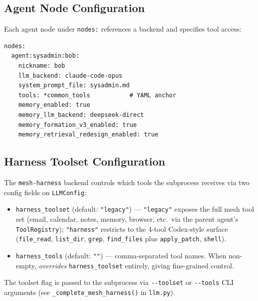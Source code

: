 \documentclass[11pt,a4paper]{article}
\newcommand{\code}[1]{\texttt{#1}}
\begin{document}
\subsection{Agent Node Configuration}

Each agent node under \code{nodes:} references a backend and specifies
tool access:
\begin{lstlisting}
nodes:
  agent:sysadmin:bob:
    nickname: bob
    llm_backend: claude-code-opus
    system_prompt_file: sysadmin.md
    tools: *common_tools           # YAML anchor
    memory_enabled: true
    memory_llm_backend: deepseek-direct
    memory_formation_v3_enabled: true
    memory_retrieval_redesign_enabled: true
\end{lstlisting}

\subsection{Harness Toolset Configuration}
\label{sec:harness-toolset}

The \code{mesh-harness} backend controls which tools the subprocess
receives via two config fields on \code{LLMConfig}:

\begin{itemize}[nosep]
  \item \code{harness\_toolset} (default: \code{"legacy"}) ---
        \code{"legacy"} exposes the full mesh tool set (email, calendar,
        notes, memory, browser, etc.\ via the parent agent's
        \code{ToolRegistry}); \code{"harness"} restricts to the 4-tool
        Codex-style surface (\code{file\_read}, \code{list\_dir},
        \code{grep}, \code{find\_files} plus \code{apply\_patch},
        \code{shell}).
  \item \code{harness\_tools} (default: \code{""}) --- comma-separated
        tool names. When non-empty, \emph{overrides}
        \code{harness\_toolset} entirely, giving fine-grained control.
\end{itemize}

\noindent
The toolset flag is passed to the subprocess via \code{-{}-toolset} or
\code{-{}-tools} CLI arguments (see \code{\_complete\_mesh\_harness()}
in \code{llm.py}).
\end{document}
